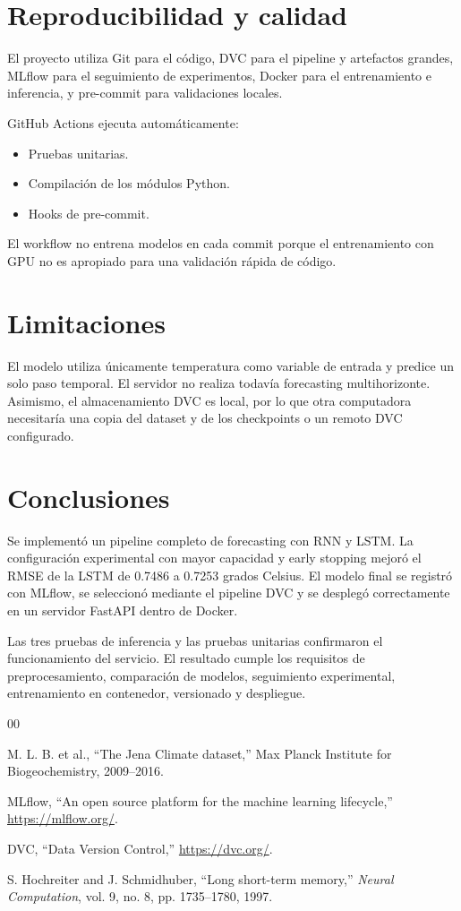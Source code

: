 \documentclass[conference]{IEEEtran}
\begin{document}
\section{Reproducibilidad y calidad}

El proyecto utiliza Git para el código, DVC para el pipeline y artefactos
grandes, MLflow para el seguimiento de experimentos, Docker para el
entrenamiento e inferencia, y pre-commit para validaciones locales.

GitHub Actions ejecuta automáticamente:

\begin{itemize}
    \item Pruebas unitarias.
    \item Compilación de los módulos Python.
    \item Hooks de pre-commit.
\end{itemize}

El workflow no entrena modelos en cada commit porque el entrenamiento con GPU
no es apropiado para una validación rápida de código.

\section{Limitaciones}

El modelo utiliza únicamente temperatura como variable de entrada y predice
un solo paso temporal. El servidor no realiza todavía forecasting
multihorizonte. Asimismo, el almacenamiento DVC es local, por lo que otra
computadora necesitaría una copia del dataset y de los checkpoints o un
remoto DVC configurado.

\section{Conclusiones}

Se implementó un pipeline completo de forecasting con RNN y LSTM. La
configuración experimental con mayor capacidad y early stopping mejoró el
RMSE de la LSTM de 0.7486 a 0.7253 grados Celsius. El modelo final se
registró con MLflow, se seleccionó mediante el pipeline DVC y se desplegó
correctamente en un servidor FastAPI dentro de Docker.

Las tres pruebas de inferencia y las pruebas unitarias confirmaron el
funcionamiento del servicio. El resultado cumple los requisitos de
preprocesamiento, comparación de modelos, seguimiento experimental,
entrenamiento en contenedor, versionado y despliegue.

\begin{thebibliography}{00}

M. L. B. et al., ``The Jena Climate dataset,'' Max Planck Institute for
Biogeochemistry, 2009--2016.

MLflow, ``An open source platform for the machine learning lifecycle,''
\url{https://mlflow.org/}.

DVC, ``Data Version Control,'' \url{https://dvc.org/}.

S. Hochreiter and J. Schmidhuber, ``Long short-term memory,''
\textit{Neural Computation}, vol. 9, no. 8, pp. 1735--1780, 1997.

\end{thebibliography}
\end{document}
